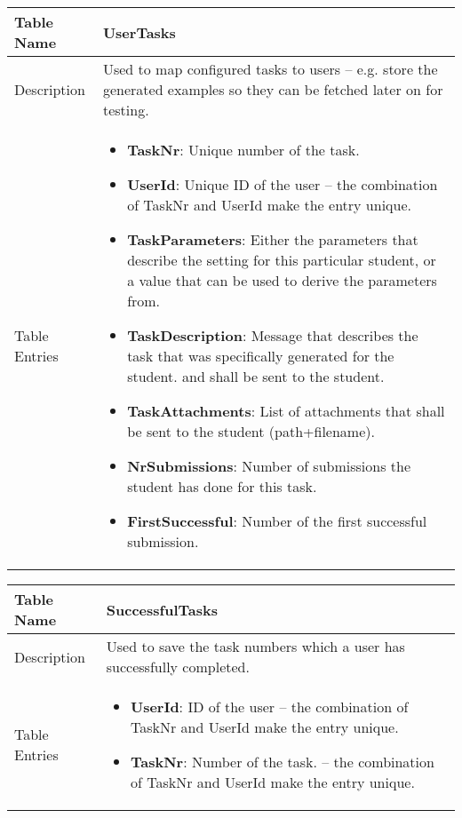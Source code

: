 \begin{tabular}{|p{3cm}|p{10cm}|}
\hline
Table Name & UserTasks \\
\hline
Description & Used to map configured tasks to users -- e.g. store the generated examples so they can be
    fetched later on for testing.\\
\hline
Table Entries & \begin{itemize}
    \item {\bf TaskNr}: Unique number of the task.
    \item {\bf UserId}: Unique ID of the user -- the combination of TaskNr and UserId make the entry unique.
    \item {\bf TaskParameters}: Either the parameters that describe the setting for this particular student, or a value that can be
        used to derive the parameters from.
    \item {\bf TaskDescription}: Message that describes the task that was specifically generated for the student.
        and shall be sent to the student.
    \item {\bf TaskAttachments}: List of attachments that shall be sent to the student (path+filename).
    \item {\bf NrSubmissions}: Number of submissions the student has done for this task.
    \item {\bf FirstSuccessful}: Number of the first successful submission.
\end{itemize} \\
\hline
\end{tabular}

\begin{tabular}{|p{3cm}|p{10cm}|}
\hline
Table Name & SuccessfulTasks \\
\hline
Description & Used to save the task numbers which a user has successfully completed.\\
\hline
Table Entries & \begin{itemize}
    \item {\bf UserId}: ID of the user -- the combination of TaskNr and UserId make the entry unique.
    \item {\bf TaskNr}: Number of the task. -- the combination of TaskNr and UserId make the entry unique.
\end{itemize} \\
\hline
\end{tabular}



